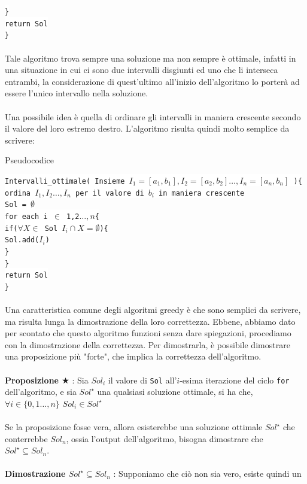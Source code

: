 \documentclass[12pt, letterpaper]{article}
\newcommand{\code}[1]{\colorbox{light-gray}{\texttt{#1}}}
\newcommand{\codee}[1]{\colorbox{white}{\texttt{#1}}}
\newcommand{\acc}{\\\hphantom{}\\}
\begin{document}
\hphantom{ident}\codee{\}}\\
\hphantom{ident}\codee{return Sol}\\
\codee{\}}\acc 
Tale algoritmo trova sempre una soluzione ma non sempre è ottimale, infatti in una situazione in cui ci sono due intervalli 
disgiunti ed uno che li interseca entrambi, la considerazione di quest'ultimo all'inizio dell'algoritmo lo porterà ad 
essere l'unico intervallo nella soluzione.\acc 
Una possibile idea è quella di ordinare gli intervalli in maniera crescente secondo il valore del loro estremo destro. L'algoritmo 
risulta quindi molto semplice da scrivere:\begin{center}
    Pseudocodice
\end{center}
\codee{Intervalli\_ottimale( Insieme $I_1=[a_1,b_1],I_2=[a_2,b_2]\dots,I_n=[a_n,b_n]$ )\{}\\
\hphantom{ident}\codee{ordina $I_1,I_2\dots,I_n$ per il valore di $b_i$ in maniera crescente}\\
\hphantom{ident}\codee{Sol = $\emptyset$}\\
\hphantom{ident}\codee{for each i $\in$ 1,2$\dots,n$\{}\\
\hphantom{ident}\hphantom{ident}\codee{if($\forall X \in $ Sol $I_i\cap X =\emptyset$)\{}\\
\hphantom{ident}\hphantom{ident}\hphantom{ident}\codee{Sol.add($I_i$)}\\
\hphantom{ident}\hphantom{ident}\codee{\}}\\
\hphantom{ident}\codee{\}}\\
\hphantom{ident}\codee{return Sol}\\
\codee{\}}\acc
Una caratteristica comune degli algoritmi greedy è che sono semplici da scrivere, ma risulta lunga la dimostrazione della 
loro correttezza. Ebbene, abbiamo dato per scontato che questo algoritmo funzioni senza dare spiegazioni, procediamo con la dimostrazione 
della correttezza. Per dimostrarla, è possibile dimostrare una proposizione più "forte", che implica la correttezza dell'algoritmo. \acc 
\textbf{Proposizione $\bigstar$ } : Sia $Sol_i$ il valore di \code{Sol} all'$i$-esima iterazione del ciclo \code{for} 
dell'algoritmo, e sia $Sol^\star$ una qualsiasi soluzione ottimale, si ha che, $\forall i\in \{0,1\dots,n\}$ $Sol_i\in Sol^\star$
\acc 
Se la proposizione fosse vera, allora esisterebbe una soluzione ottimale $Sol^\star$ che conterrebbe $Sol_n$, ossia 
l'output dell'algoritmo, bisogna dimostrare che $Sol^\star \subseteq Sol_n$. \acc 
\textbf{Dimostrazione $Sol^\star \subseteq Sol_n$} : Supponiamo che ciò non sia vero, esiste quindi un 
\end{document}
